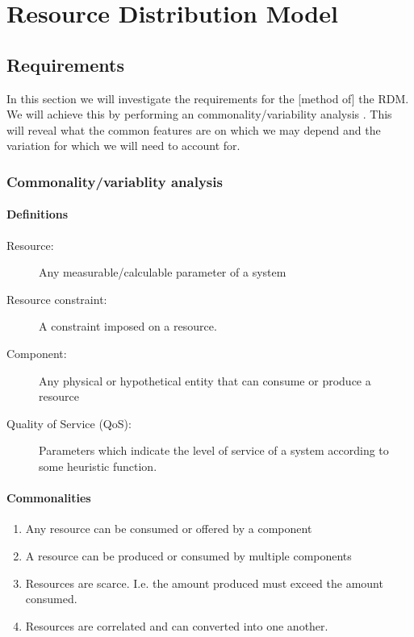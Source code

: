 \newcommand{\rdmid}{1}
\chapter{Resource Distribution Model}
\section{Requirements}
In this section we will investigate the requirements for the [method of] the RDM. We will achieve this by performing an commonality/variability analysis \cite{var_invar}. This will reveal what the common features are on which we may depend and the variation for which we will need to account for.
\subsection{Commonality/variablity analysis}
\subsubsection{Definitions}
\begin{description}
\item[Resource:] Any measurable/calculable parameter of a system
\item[Resource constraint:] A constraint imposed on a resource.
\item[Component:] Any physical or hypothetical entity that can consume or produce a resource
\item[Quality of Service (QoS):] Parameters which indicate the level of service of a system according to some heuristic function.
\end{description}
\subsubsection{Commonalities}
\begin{enumerate}[label=C\rdmid .\arabic*]
\item Any resource can be consumed or offered by a component
\item A resource can be produced or consumed by multiple components
\item Resources are scarce. I.e. the amount produced must exceed the amount consumed.
\item \label{c:res_transf} Resources are correlated and can converted into one another.
\end{enumerate}

